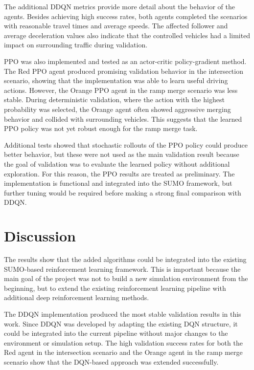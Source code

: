 \documentclass{article}
\begin{document}
\noindent
The additional DDQN metrics provide more detail about the behavior of the agents. Besides achieving high success rates, both agents completed the scenarios with reasonable travel times and average speeds. The affected follower and average deceleration values also indicate that the controlled vehicles had a limited impact on surrounding traffic during validation.

\noindent
PPO was also implemented and tested as an actor-critic policy-gradient method. The Red PPO agent produced promising validation behavior in the intersection scenario, showing that the implementation was able to learn useful driving actions. However, the Orange PPO agent in the ramp merge scenario was less stable. During deterministic validation, where the action with the highest probability was selected, the Orange agent often showed aggressive merging behavior and collided with surrounding vehicles. This suggests that the learned PPO policy was not yet robust enough for the ramp merge task.

\noindent
Additional tests showed that stochastic rollouts of the PPO policy could produce better behavior, but these were not used as the main validation result because the goal of validation was to evaluate the learned policy without additional exploration. For this reason, the PPO results are treated as preliminary. The implementation is functional and integrated into the SUMO framework, but further tuning would be required before making a strong final comparison with DDQN.




\section{Discussion}

The results show that the added algorithms could be integrated into the existing SUMO-based reinforcement learning framework. This is important because the main goal of the project was not to build a new simulation environment from the beginning, but to extend the existing reinforcement learning pipeline with additional deep reinforcement learning methods.

The DDQN implementation produced the most stable validation results in this work. Since DDQN was developed by adapting the existing DQN structure, it could be integrated into the current pipeline without major changes to the environment or simulation setup. The high validation success rates for both the Red agent in the intersection scenario and the Orange agent in the ramp merge scenario show that the DQN-based approach was extended successfully.
\end{document}
